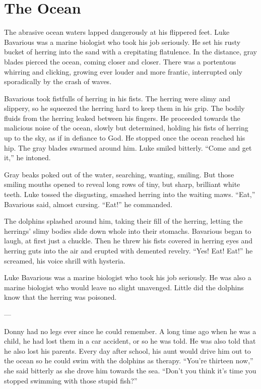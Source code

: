 \chapter{The Ocean}

The abrasive ocean waters lapped dangerously at his flippered feet.
Luke Bavarious was a marine biologist who took his job seriously.
He set his rusty bucket of herring into the sand with a crepitating
flatulence. In the distance, gray blades pierced the ocean, coming
closer and closer. There was a portentous whirring and clicking,
growing ever louder and more frantic, interrupted only sporadically
by the crash of waves.



Bavarious took fistfulls of herring in his fists. The herring were
slimy and slippery, so he squeezed the herring hard to keep them in
his grip. The bodily fluids from the herring leaked between his
fingers. He proceeded towards the malicious noise of the ocean,
slowly but determined, holding his fists of herring up to the sky,
as if in defiance to God. He stopped once the ocean reached his
hip. The gray blades swarmed around him. Luke smiled bitterly.
``Come and get it,'' he intoned.



Gray beaks poked out of the water, searching, wanting, smiling. But
those smiling mouths opened to reveal long rows of tiny, but sharp,
brilliant white teeth. Luke tossed the disgusting, smashed herring
into the waiting maws. ``Eat,'' Bavarious said, almost cursing.
``Eat!'' he commanded.



The dolphins splashed around him, taking their fill of the herring,
letting the herrings' slimy bodies slide down whole into their
stomachs. Bavarious began to laugh, at first just a chuckle. Then
he threw his fists covered in herring eyes and herring guts into
the air and erupted with demented revelry. ``Yes! Eat! Eat!'' he
screamed, his voice shrill with hysteria.



Luke Bavarious was a marine biologist who took his job seriously.
He was also a marine biologist who would leave no slight unavenged.
Little did the dolphins know that the herring was poisoned.



---



Donny had no legs ever since he could remember. A long time ago
when he was a child, he had lost them in a car accident, or so he
was told. He was also told that he also lost his parents. Every day
after school, his aunt would drive him out to the ocean so he could
swim with the dolphins as therapy. ``You're thirteen now,'' she said
bitterly as she drove him towards the sea. ``Don't you think it's
time you stopped swimming with those stupid fish?''



